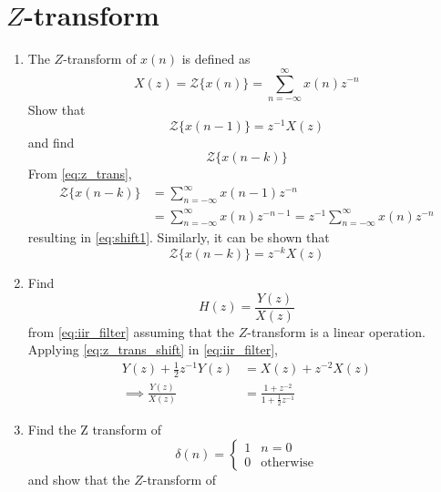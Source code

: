 \documentclass[journal,12pt,twocolumn]{IEEEtran}
\renewcommand\thesection{\arabic{section}}
\begin{document}
\section{$Z$-transform}
\begin{enumerate}[label=\thesection.\arabic*]
\item The $Z$-transform of $x(n)$ is defined as
%
\begin{equation}
\label{eq:z_trans}
X(z)={\mathcal {Z}}\{x(n)\}=\sum _{n=-\infty }^{\infty }x(n)z^{-n}
\end{equation}
%
Show that
\begin{equation}
\label{eq:shift1}
{\mathcal {Z}}\{x(n-1)\} = z^{-1}X(z)
\end{equation}
and find
\begin{equation}
	{\mathcal {Z}}\{x(n-k)\} 
\end{equation}
\solution From \eqref{eq:z_trans},
\begin{align}
{\mathcal {Z}}\{x(n-k)\} &=\sum _{n=-\infty }^{\infty }x(n-1)z^{-n}
\\
&=\sum _{n=-\infty }^{\infty }x(n)z^{-n-1} = z^{-1}\sum _{n=-\infty }^{\infty }x(n)z^{-n}
\end{align}
resulting in \eqref{eq:shift1}. Similarly, it can be shown that
%
\begin{equation}
\label{eq:z_trans_shift}
	{\mathcal {Z}}\{x(n-k)\} = z^{-k}X(z)
\end{equation}
\item Find
%
\begin{equation}
H(z) = \frac{Y(z)}{X(z)}
\end{equation}
%
from  \eqref{eq:iir_filter} assuming that the $Z$-transform is a linear operation.
\\
\solution  Applying \eqref{eq:z_trans_shift} in \eqref{eq:iir_filter},
\begin{align}
Y(z) + \frac{1}{2}z^{-1}Y(z) &= X(z)+z^{-2}X(z)
\\
\implies \frac{Y(z)}{X(z)} &= \frac{1 + z^{-2}}{1 + \frac{1}{2}z^{-1}}
\label{eq:freq_resp}
\end{align}
%
\item Find the Z transform of 
\begin{equation}
\delta(n)
=
\begin{cases}
1 & n = 0
\\
0 & \text{otherwise}
\end{cases}
\end{equation}
and show that the $Z$-transform of
\begin{equation}

\end{equation}
\end{enumerate}
\end{document}
